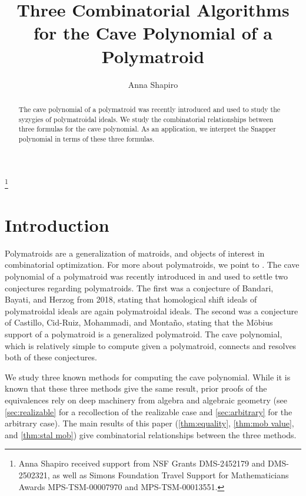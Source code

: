 \documentclass[a4paper, 11pt]{amsart}
\theoremstyle{definition}
\begin{document}
\title{Three Combinatorial Algorithms for the Cave Polynomial of a Polymatroid}
\author{Anna Shapiro}
    \address{Department of Mathematics, North Carolina State University, Raleigh, NC 27695, USA}


	
	
	
	
	\begin{abstract}
The cave polynomial of a polymatroid was recently introduced and used to study the syzygies of polymatroidal ideals. We study the combinatorial relationships between three formulas for the cave polynomial. As an application, we interpret the Snapper polynomial in terms of these three formulas.
	\end{abstract}

    \thanks{Anna Shapiro received support from NSF Grants DMS-2452179 and  DMS-2502321, as well as Simons Foundation Travel Support for Mathematicians Awards MPS-TSM-00007970 and MPS-TSM-00013551.}

\maketitle

\section{Introduction}
Polymatroids are a generalization of matroids, and objects of interest in combinatorial optimization.  For more about polymatroids, we point to \cite{Schrijver}. The cave polynomial of a polymatroid was recently introduced in \cite{CRMS} and used to settle two conjectures regarding polymatroids. The first was a conjecture of Bandari, Bayati, and Herzog from 2018, stating that homological shift ideals of polymatroidal ideals are again polymatroidal ideals. The second was a conjecture of Castillo, Cid-Ruiz, Mohammadi, and Monta\~no, stating that the M\"obius support of a polymatroid is a generalized polymatroid. The cave polynomial, which is relatively simple to compute given a polymatroid, connects and resolves both of these conjectures. 
\medskip

We study three known methods for computing the cave polynomial. While it is known that these three methods give the same result, prior proofs of the equivalences rely on deep machinery from algebra and algebraic geometry (see \autoref{sec:realizable} for a recollection of the realizable case and \autoref{sec:arbitrary} for the arbitrary case). The main results of this paper (\autoref{thm:equality}, \autoref{thm:mob value}, and \autoref{thm:stal mob}) give combinatorial relationships between the three methods. 
\medskip
\end{document}
